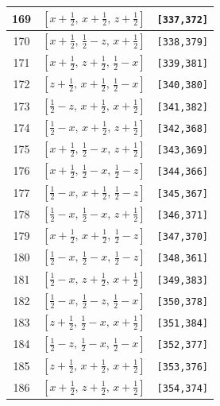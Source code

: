 \documentclass[fleqn,8pt]{jsarticle}
\begin{document}
\begin{longtable}{ccc}
169 & $\left[ x + \frac{1}{2},\, x + \frac{1}{2},\, z + \frac{1}{2} \right]$ & {\tt [337,372]} \\ \hline
170 & $\left[ x + \frac{1}{2},\, \frac{1}{2} - z,\, x + \frac{1}{2} \right]$ & {\tt [338,379]} \\ \hline
171 & $\left[ x + \frac{1}{2},\, z + \frac{1}{2},\, \frac{1}{2} - x \right]$ & {\tt [339,381]} \\ \hline
172 & $\left[ z + \frac{1}{2},\, x + \frac{1}{2},\, \frac{1}{2} - x \right]$ & {\tt [340,380]} \\ \hline
173 & $\left[ \frac{1}{2} - z,\, x + \frac{1}{2},\, x + \frac{1}{2} \right]$ & {\tt [341,382]} \\ \hline
174 & $\left[ \frac{1}{2} - x,\, x + \frac{1}{2},\, z + \frac{1}{2} \right]$ & {\tt [342,368]} \\ \hline
175 & $\left[ x + \frac{1}{2},\, \frac{1}{2} - x,\, z + \frac{1}{2} \right]$ & {\tt [343,369]} \\ \hline
176 & $\left[ x + \frac{1}{2},\, \frac{1}{2} - x,\, \frac{1}{2} - z \right]$ & {\tt [344,366]} \\ \hline
177 & $\left[ \frac{1}{2} - x,\, x + \frac{1}{2},\, \frac{1}{2} - z \right]$ & {\tt [345,367]} \\ \hline
178 & $\left[ \frac{1}{2} - x,\, \frac{1}{2} - x,\, z + \frac{1}{2} \right]$ & {\tt [346,371]} \\ \hline
179 & $\left[ x + \frac{1}{2},\, x + \frac{1}{2},\, \frac{1}{2} - z \right]$ & {\tt [347,370]} \\ \hline
180 & $\left[ \frac{1}{2} - x,\, \frac{1}{2} - x,\, \frac{1}{2} - z \right]$ & {\tt [348,361]} \\ \hline
181 & $\left[ \frac{1}{2} - x,\, z + \frac{1}{2},\, x + \frac{1}{2} \right]$ & {\tt [349,383]} \\ \hline
182 & $\left[ \frac{1}{2} - x,\, \frac{1}{2} - z,\, \frac{1}{2} - x \right]$ & {\tt [350,378]} \\ \hline
183 & $\left[ z + \frac{1}{2},\, \frac{1}{2} - x,\, x + \frac{1}{2} \right]$ & {\tt [351,384]} \\ \hline
184 & $\left[ \frac{1}{2} - z,\, \frac{1}{2} - x,\, \frac{1}{2} - x \right]$ & {\tt [352,377]} \\ \hline
185 & $\left[ z + \frac{1}{2},\, x + \frac{1}{2},\, x + \frac{1}{2} \right]$ & {\tt [353,376]} \\ \hline
186 & $\left[ x + \frac{1}{2},\, z + \frac{1}{2},\, x + \frac{1}{2} \right]$ & {\tt [354,374]} \\ \hline

\end{longtable}
\end{document}
